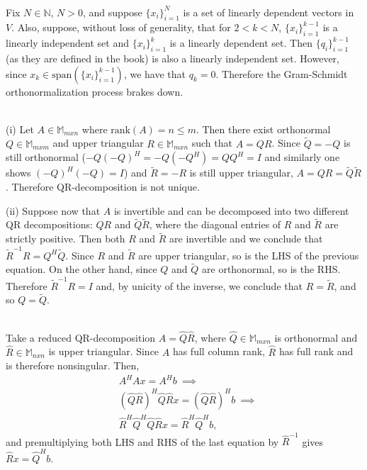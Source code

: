 \documentclass[letterpaper,12pt]{article}
\theoremstyle{definition}
\newenvironment{problem}[2][Problem]{\begin{trivlist}
\item[\hskip \labelsep {\bfseries #1}\hskip \labelsep {\bfseries #2.}]}{\end{trivlist}}
\begin{document}
\begin{problem}{11}~\\
Fix $N\in\mathbb N$, $N>0$, and suppose $\{x_i\}_{i=1}^N$ is a set of
linearly dependent vectors in $V$.
Also, suppose, without loss of generality, that for $2<k<N$,
$\{x_i\}_{i=1}^{k-1}$ is a linearly independent set and $\{x_i\}_{i=1}^k$ is a linearly dependent set.
Then $\{q_i\}_{i=1}^{k-1}$ (as they are defined in the book) is also a linearly independent set.
However, since $x_k\in\text{span}(\{x_i\}_{i=1}^{k-1})$, we have that $q_k=0$.
Therefore the Gram-Schmidt orthonormalization process brakes down.

\end{problem}
\begin{problem}{16}~\\
(i)
Let $A\in\mathbb M_{mxn}$ where $\text{rank}(A)=n\leq m$.
Then there exist orthonormal $Q\in\mathbb M_{mxm}$ and
upper triangular $R\in\mathbb M_{mxn}$ such that $A=QR$.
Since $\tilde{Q}=-Q$ is still orthonormal ($-Q(-Q)^H=-Q(-Q^H)=QQ^H=I$
and similarly one shows $(-Q)^H(-Q)=I$)
and $\tilde{R}=-R$ is still upper triangular,
$A=QR=\tilde{Q}\tilde{R}$.
Therefore QR-decomposition is not unique.

(ii)
Suppose now that $A$ is invertible and can be decomposed into
two different QR decompositions: $QR$ and $\tilde{Q}\tilde{R}$,
where the diagonal entries of $R$ and $\tilde{R}$ are strictly positive.
Then both $R$ and $\tilde{R}$ are invertible and we conclude that
$\tilde{R}^{-1}R=Q^H\tilde{Q}$.
Since $R$ and $\tilde{R}$ are upper triangular, so is the LHS of the previous equation.
On the other hand, since $Q$ and $\tilde{Q}$ are orthonormal, so is the RHS.
Therefore $\tilde{R}^{-1}R=I$ and, by unicity of the inverse, we conclude that $R=\tilde{R}$,
and so $Q=\tilde{Q}$.

\end{problem}
\begin{problem}{17}~\\
Take a reduced QR-decomposition $A=\hat{Q}\hat{R}$,
where $\hat{Q}\in\mathbb M_{mxn}$ is orthonormal and $\hat{R}\in\mathbb M_{nxn}$ is upper triangular.
Since $A$ has full column rank, $\hat{R}$ has full rank and is therefore nonsingular.
Then,
\begin{align*}
    &A^HAx=A^Hb\ \implies\\
    &(\hat{Q}\hat{R})^H\hat{Q}\hat{R}x = (\hat{Q}\hat{R})^Hb\ \implies\\
    &\hat{R}^H\hat{Q}^H\hat{Q}\hat{R}x = \hat{R}^H\hat{Q}^Hb,
\end{align*}
and premultiplying both LHS and RHS of the last equation by $\hat{R}^{-1}$ gives
$\hat{R}x = \hat{Q}^Hb$.

\end{problem}
\end{document}
